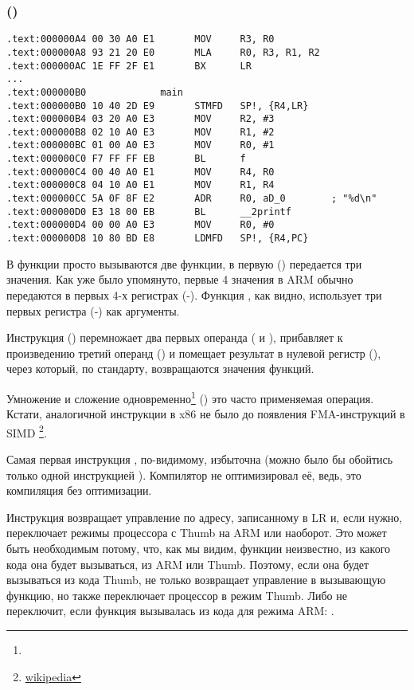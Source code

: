 \subsubsection{\NonOptimizingKeilVI (\ARMMode)}

\begin{lstlisting}
.text:000000A4 00 30 A0 E1       MOV     R3, R0
.text:000000A8 93 21 20 E0       MLA     R0, R3, R1, R2
.text:000000AC 1E FF 2F E1       BX      LR
...
.text:000000B0             main
.text:000000B0 10 40 2D E9       STMFD   SP!, {R4,LR}
.text:000000B4 03 20 A0 E3       MOV     R2, #3
.text:000000B8 02 10 A0 E3       MOV     R1, #2
.text:000000BC 01 00 A0 E3       MOV     R0, #1
.text:000000C0 F7 FF FF EB       BL      f
.text:000000C4 00 40 A0 E1       MOV     R4, R0
.text:000000C8 04 10 A0 E1       MOV     R1, R4
.text:000000CC 5A 0F 8F E2       ADR     R0, aD_0        ; "%d\n"
.text:000000D0 E3 18 00 EB       BL      __2printf
.text:000000D4 00 00 A0 E3       MOV     R0, #0
.text:000000D8 10 80 BD E8       LDMFD   SP!, {R4,PC}
\end{lstlisting}

В функции \main просто вызываются две функции, в первую (\ttf) передается три значения.
Как уже было упомянуто, первые 4 значения в ARM обычно передаются в первых 4-х регистрах (-).
Функция \ttf, как видно, использует три первых регистра (-) как аргументы.

Инструкция  () перемножает два первых операнда ( и ), 
прибавляет к произведению
третий операнд () и помещает результат в нулевой регистр (), через который, по стандарту, 
возвращаются значения функций.

Умножение и сложение одновременно\footnote{\WPMAO} 
() это часто применяемая операция. Кстати, аналогичной
инструкции в x86 не было до появления FMA-инструкций в SIMD
\footnote{\href{http://go.yurichev.com/17103}{wikipedia}}.

Самая первая инструкция , по-видимому, избыточна (можно было бы обойтись только одной инструкцией ).
Компилятор не оптимизировал её, ведь, это компиляция без оптимизации.

Инструкция  возвращает управление по адресу, записанному в \ac{LR} и, если нужно, 
переключает режимы процессора с Thumb на ARM или наоборот.
Это может быть необходимым потому, что, как мы видим, 
функции \ttf неизвестно, из какого кода она будет вызываться, из ARM или Thumb.
Поэтому, если она будет вызываться из кода Thumb,  не только возвращает
управление в вызывающую функцию, но также переключает процессор в режим Thumb.
Либо не переключит, если функция вызывалась из кода для режима ARM: .

